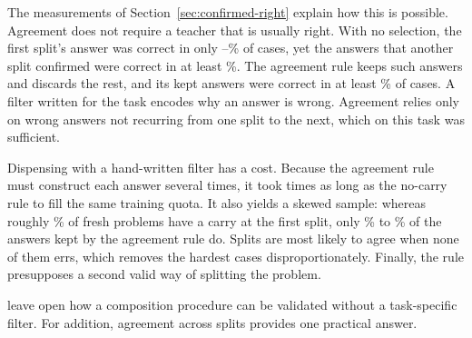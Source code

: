 

The measurements of Section~\ref{sec:confirmed-right} explain how this is
possible. Agreement does not require a teacher that is usually right. With no
selection, the first split's answer was correct in only
\gpTaNoSelectAccLow--\gpTaNoSelectAccHigh\% of cases, yet the answers that
another split confirmed were correct in at least
\gpTaNoSelectAccConfirmedLow\%. The agreement rule keeps such answers and
discards the rest, and its kept answers were correct in at least
\gpTaAgreementAccLow\% of cases. A filter written for the task encodes why an
answer is wrong. Agreement relies only on wrong answers not recurring from
one split to the next, which on this task was sufficient.

Dispensing with a hand-written filter has a cost. Because the agreement rule
must construct each answer several times, it took \gpBuildRatio{} times as
long as the no-carry rule to fill the same training quota. It also yields a
skewed sample: whereas roughly \gpNaturalCarryLow\% of fresh problems have a
carry at the first split, only \gpKeptAgreementLow\% to
\gpKeptAgreementHigh\% of the answers kept by the agreement rule do. Splits
are most likely
to agree when none of them errs, which removes the hardest cases
disproportionately. Finally, the rule presupposes a second valid way of
splitting the problem.

\citet{shin2026compositional} leave open how a composition procedure can be
validated without a task-specific filter. For addition, agreement across
splits provides one practical answer.




